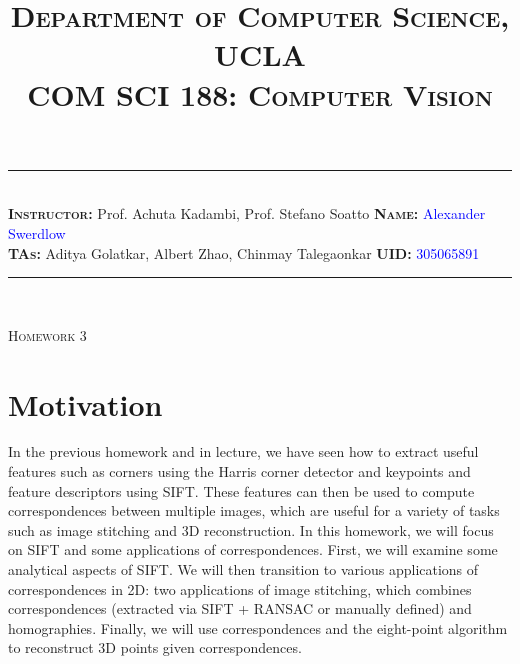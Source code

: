 \documentclass[answers]{exam}
\title{\normalfont \normalsize
\textsc{{Department of Computer Science, UCLA \\
COM SCI 188: Computer Vision}}
\date{\vspace{-12ex}}
}
\newcommand{\myinput}[1]{\textcolor{blue}{#1}}
\begin{document}
\maketitle
\rule{\linewidth}{0.8pt} \\[6pt] 
\noindent
\large\textbf{\textsc{Instructor:}} Prof. Achuta Kadambi, Prof. Stefano Soatto \hfill \large\textbf{\textsc{Name:}} \myinput{Alexander Swerdlow}\\
\large\textbf{\textsc{TAs:}} Aditya Golatkar, Albert Zhao, Chinmay Talegaonkar \hfill 
\large\textbf{\textsc{UID:}} \myinput{305065891}
\rule{\linewidth}{0.8pt} \\[6pt] 

\begin{center}
{\textsc{Homework 3}} 
\end{center}


\begin{table}[h]
\centering
{}
\caption*{}
\label{}
\end{table}

\newpage

\section*{Motivation}

In the previous homework and in lecture, we have seen how to extract useful features such as corners using the Harris corner detector and keypoints and feature descriptors using SIFT. These features can then be used to compute correspondences between multiple images, which are useful for a variety of tasks such as image stitching and 3D reconstruction. In this homework, we will focus on SIFT and some applications of correspondences. First, we will examine some analytical aspects of SIFT. We will then transition to various applications of correspondences in 2D: two applications of image stitching, which combines correspondences (extracted via SIFT + RANSAC or manually defined) and homographies. Finally, we will use correspondences and the eight-point algorithm to reconstruct 3D points given correspondences. 
\end{document}
